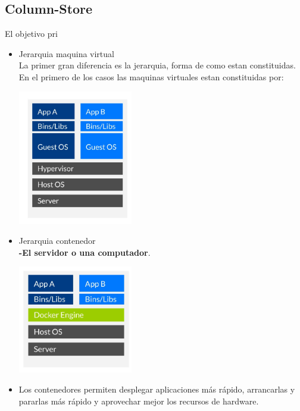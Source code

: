 \documentclass[twoside,twocolumn]{article}
\begin{document}
\subsection{Column-Store}
El objetivo pri

\begin{itemize}
	\item Jerarquia maquina virtual
	\\La primer gran diferencia es la jerarquia, forma de como estan constituidas. En el primero de los casos las maquinas virtuales estan constituidas por:

	\begin{center}
	\includegraphics[width=5cm]{./Imagenes/jerarquia1} 
	\end{center}
\end{itemize} 

\begin{itemize}
	\item Jerarquia contenedor
	\\ \textbf{-El servidor o una computador}.

	\begin{center}
	\includegraphics[width=5cm]{./Imagenes/jerarquia2} 
	\end{center}
\end{itemize} 

\begin{itemize}
	\item Los contenedores permiten desplegar aplicaciones más rápido, arrancarlas y pararlas más rápido y aprovechar mejor los recursos de hardware.




\end{itemize} 
\end{document}
